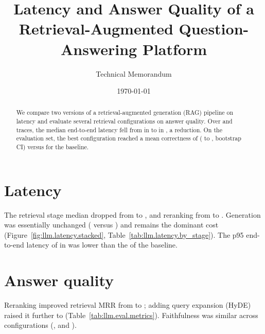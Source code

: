 \documentclass[11pt]{article}
\title{Latency and Answer Quality of a Retrieval-Augmented Question-Answering Platform}
\author{Technical Memorandum}
\date{\today}
\begin{document}
\maketitle

\begin{abstract}
We compare two versions of a retrieval-augmented generation (RAG) pipeline on latency and
evaluate several retrieval configurations on answer quality. Over 
and  traces, the median end-to-end latency fell from
 in  to
 in , a
 reduction. On the evaluation set, the best configuration
reached a mean correctness of 
( to ,
bootstrap CI) versus  for the baseline.
\end{abstract}

\section{Latency}
The retrieval stage median dropped from  to
, and reranking from
 to . Generation was
essentially unchanged ( versus
) and remains the dominant cost
(Figure~\ref{fig:llm.latency.stacked}, Table~\ref{tab:llm.latency.by_stage}). The p95
end-to-end latency of  in 
was lower than the  of the baseline.


\section{Answer quality}
Reranking improved retrieval MRR from  to
; adding query expansion (HyDE) raised it further to
 (Table~\ref{tab:llm.eval.metrics}). Faithfulness
was similar across configurations (,
 and ).

\end{document}
